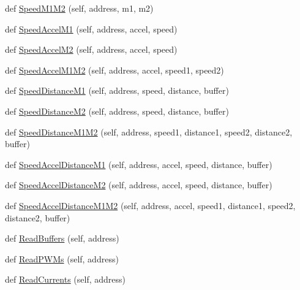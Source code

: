 \begin{DoxyCompactItemize}
\item 
def \mbox{\hyperlink{classtoxic__hardware_1_1roboclaw__3_1_1Roboclaw_a424b0f413de3417ce5366e7baaa7258c}{Speed\+M1\+M2}} (self, address, m1, m2)
\item 
def \mbox{\hyperlink{classtoxic__hardware_1_1roboclaw__3_1_1Roboclaw_a808d9e2e771ec6e9e1ddfc3f6d037d53}{Speed\+Accel\+M1}} (self, address, accel, speed)
\item 
def \mbox{\hyperlink{classtoxic__hardware_1_1roboclaw__3_1_1Roboclaw_aa1ea7b6e240492550bedda7a4d4b4d02}{Speed\+Accel\+M2}} (self, address, accel, speed)
\item 
def \mbox{\hyperlink{classtoxic__hardware_1_1roboclaw__3_1_1Roboclaw_a79374c8b011c304cff568bee27a53871}{Speed\+Accel\+M1\+M2}} (self, address, accel, speed1, speed2)
\item 
def \mbox{\hyperlink{classtoxic__hardware_1_1roboclaw__3_1_1Roboclaw_a625f74cfbfcc1d23552cc32073b6bdac}{Speed\+Distance\+M1}} (self, address, speed, distance, buffer)
\item 
def \mbox{\hyperlink{classtoxic__hardware_1_1roboclaw__3_1_1Roboclaw_a413895339f5c4c7b81a3a3275378c734}{Speed\+Distance\+M2}} (self, address, speed, distance, buffer)
\item 
def \mbox{\hyperlink{classtoxic__hardware_1_1roboclaw__3_1_1Roboclaw_a0ab2528100dde6a8ac03e7d8cd380530}{Speed\+Distance\+M1\+M2}} (self, address, speed1, distance1, speed2, distance2, buffer)
\item 
def \mbox{\hyperlink{classtoxic__hardware_1_1roboclaw__3_1_1Roboclaw_a19124958957ce9019aee69c7882944d0}{Speed\+Accel\+Distance\+M1}} (self, address, accel, speed, distance, buffer)
\item 
def \mbox{\hyperlink{classtoxic__hardware_1_1roboclaw__3_1_1Roboclaw_a517dde606ac755d633d998b139dc19b0}{Speed\+Accel\+Distance\+M2}} (self, address, accel, speed, distance, buffer)
\item 
def \mbox{\hyperlink{classtoxic__hardware_1_1roboclaw__3_1_1Roboclaw_a7dc5a98b596f61c379da5c725d7db7e4}{Speed\+Accel\+Distance\+M1\+M2}} (self, address, accel, speed1, distance1, speed2, distance2, buffer)
\item 
def \mbox{\hyperlink{classtoxic__hardware_1_1roboclaw__3_1_1Roboclaw_ae5f18d889f7971d1d6cf50439a925c8d}{Read\+Buffers}} (self, address)
\item 
def \mbox{\hyperlink{classtoxic__hardware_1_1roboclaw__3_1_1Roboclaw_a653e61e60b85b4d9eb48b6b83d91245e}{Read\+P\+W\+Ms}} (self, address)
\item 
def \mbox{\hyperlink{classtoxic__hardware_1_1roboclaw__3_1_1Roboclaw_ab13eb39a37dcc4e30f70b702e48b40c5}{Read\+Currents}} (self, address)

\end{DoxyCompactItemize}
